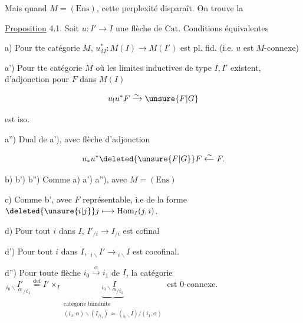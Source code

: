 

Mais quand $M=(\mathrm{Ens})$, cette perplexité disparaît. On trouve la

\uline{Proposition} 4.1. Soit $u:I'\to I$ une flèche de $\mathrm{Cat}$. Conditions équivalentes

a) Pour tte catégorie $M$, $u^*_M:M(I)\to M(I')$ est pl. fid. (i.e. $u$ est $M$-connexe)

a') Pour tte catégorie $M$\unsure{,} où les limites inductives de type $I,I'$ existent,   d'adjonction pour $F$ dans $M(I)$

\[
u_!u^*F\xrightarrow{\sim}\unsure{F|G}
\]

est iso.

a'') Dual de a'), avec flèche d'adjonction

\[
u_*u^*\deleted{\unsure{F|G}}F\xleftarrow{\sim} F.
\]

b) b') b'') Comme a) a') a''), avec $M=(\mathrm{Ens})$

c) Comme b', avec $F$  représentable, i.e de la forme $\deleted{\unsure{i|j}}j\longmapsto\operatorname{Hom}_I(j,i)$.


d) Pour tout $i$ dans $I$, $I'_{/i}\to I_{/i}$ est cofinal

d') Pour tout $i$ dans $I$, $\,{}_{i\backslash}I'\to{}_{i\backslash}I$ est cocofinal.

d'') Pour toute flèche $i_0\xrightarrow{\alpha}i_1$ de $I$, la catégorie $\,{}_{i_0\backslash}\underset{\alpha}{I'}_{/i_1}\overset{\mathrm{def}}{=}I'\times_I\underbrace{{}_{i_0\backslash}\underset{\alpha}{I}_{/i_1}}_{\substack{\text{catégorie biinduite}\\(i_0,\alpha)\backslash(I_{/i_1})\,\simeq\,({}_{i_0\backslash}I)/(i_1,\alpha)}}$ est $0$-connexe.
